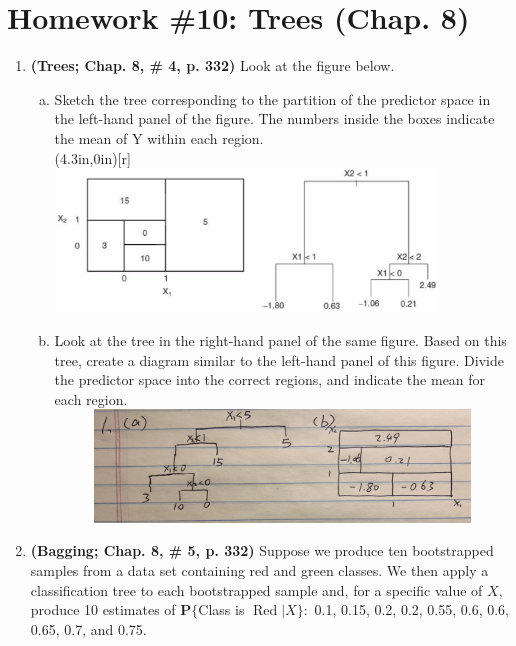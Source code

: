 \documentclass[12pt,fleqn]{article}\usepackage[]{graphicx}\usepackage[]{color}
\theoremstyle{definition}
\begin{document}
\rhead{\today}




\section*{Homework \#10: Trees (Chap. 8)}
	\begin{enumerate}[1.]
	  \item \textbf{(Trees; Chap. 8, \# 4, p. 332)} Look at the figure below.
	    \begin{enumerate}[(a)]
	      \item Sketch the tree corresponding to the partition of the predictor space in the left-hand panel of the
figure. The numbers inside the boxes indicate the mean of Y within each region.\\
      \parpic(4.3in,0in)[r]{\includegraphics[width=4in]{fig}}
        \item Look at the tree in the right-hand panel of the same figure. Based on this tree, create a diagram similar to the left-hand panel of this figure. Divide the predictor space into the correct regions, and indicate the mean for each region.\\
       \includegraphics[width=15cm, height=3cm]{1}\\
	    \end{enumerate}
    \item \textbf{(Bagging; Chap. 8, \# 5, p. 332)} Suppose we produce ten bootstrapped samples from a data set containing red and green classes. We then apply a classification tree to each bootstrapped sample and, for a specific value of $X$, produce 10 estimates of $\boldsymbol{P}\{$Class is $\operatorname{Red} | X\} :$ 0.1, 0.15, 0.2, 0.2, 0.55, 0.6, 0.6, 0.65, 0.7, and 0.75.\\[10pt]

\end{enumerate}
\end{document}
